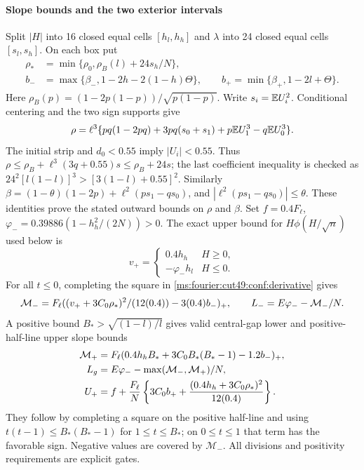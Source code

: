 \paragraph{Slope bounds and the two exterior intervals}
Split $|H|$ into 16 closed equal cells $[h_l,h_h]$ and $\lambda$ into
24 closed equal cells $[s_l,s_h]$. On each box put
\[
\begin{aligned}
 \rho_* &=\min\{\rho_0,\rho_B(l)+24s_h/N\},\\
 b_- &=\max\{\beta_-,1-2h-2(1-h)\Theta\},\qquad
 b_+ =\min\{\beta_+,1-2l+\Theta\}.
\end{aligned}
\]
Here $\rho_B(p)=(1-2p(1-p))/\sqrt{p(1-p)}$. Write $s_i=\mathbb E U_i^2$. Conditional centering and the two sign supports give
\[
 \rho=\ell^3\{pq(1-2pq)+3pq(s_0+s_1)
                  +p\mathbb E U_1^3-q\mathbb E U_0^3\}.
\]
The initial strip and $d_0<0.55$ imply $|U_i|<0.55$.
Thus $\rho\le\rho_B+\ell^3(3q+0.55)s\le\rho_B+24s$; the last
coefficient inequality is checked as
$24^2[l(1-l)]^3>[3(1-l)+0.55]^2$.
Similarly $\beta=(1-\theta)(1-2p)+\ell^2(ps_1-qs_0)$, and
$|\ell^2(ps_1-qs_0)|\le\theta$. These identities prove the stated
outward bounds on $\rho$ and $\beta$.
Set $f=0.4F_\ell$, $\varphi_-=0.39886(1-h_h^2/(2N))>0$.
The exact upper bound for $H\phi(H/\sqrt n)$ used below is
\[
 v_+=\begin{cases}0.4h_h&H\ge0,\\-\varphi_-h_l&H\le0.\end{cases}
\]
For all $t\le0$, completing the square in \eqref{ms:fourier:cut49:conf:derivative} gives
\[
 \mathcal M_-=F_\ell((v_++3C_0\rho_*)^2/(12(0.4))-3(0.4)b_-)_+,
 \qquad L_-=E\varphi_- -\mathcal M_-/N.
\]
A positive bound $B_*>\sqrt{(1-l)/l}$ gives valid central-gap lower
and positive-half-line upper slope bounds
\begin{align*}
 \mathcal M_+&=F_\ell(0.4h_hB_*+3C_0B_*(B_*-1)-1.2b_-)_+,\\
 L_g&=E\varphi_--\max(\mathcal M_-,\mathcal M_+)/N,\\
 U_+&=f+\frac{F_\ell}{N}
 \left\{3C_0b_++\frac{(0.4h_h+3C_0\rho_*)^2}{12(0.4)}\right\}.
\end{align*}
They follow by completing a square on the positive half-line and using
$t(t-1)\le B_*(B_*-1)$ for $1\le t\le B_*$; on $0\le t\le1$ that
term has the favorable sign. Negative values are covered by $\mathcal M_-$.
All divisions and positivity requirements are explicit gates.

